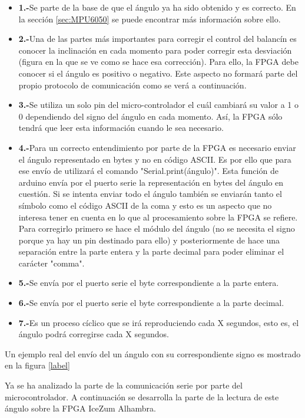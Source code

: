 \begin{itemize}
	\item \textbf{1.-}Se parte de la base de que el ángulo ya ha sido obtenido y es correcto. En la sección \ref{sec:MPU6050} se puede encontrar más información sobre ello.
	\item \textbf{2.-}Una de las partes más importantes para corregir el control del balancín es conocer la inclinación en cada momento para poder corregir esta desviación (figura en la que se ve como se hace esa corrección). Para ello, la FPGA debe conocer si el ángulo es positivo o negativo. Este aspecto no formará parte del propio protocolo de comunicación como se verá a continuación.
	\item \textbf{3.-}Se utiliza un solo pin del micro-controlador el cuál cambiará su valor a 1 o 0 dependiendo del signo del ángulo en cada momento. Así, la FPGA sólo tendrá que leer esta información cuando le sea necesario.
	\item \textbf{4.-}Para un correcto entendimiento por parte de la FPGA es necesario enviar el ángulo representado en bytes y no en código ASCII. Es por ello que para ese envío de utilizará el comando "Serial.print(ángulo)". Esta función de arduino envía por el puerto serie la representación en bytes del ángulo en cuestión.\newline
	Si se intenta enviar todo el ángulo también se enviarán tanto el símbolo como el código ASCII de la coma y esto es un aspecto que no interesa tener en cuenta en lo que al procesamiento sobre la FPGA se refiere. Para corregirlo primero se hace el módulo del ángulo (no se necesita el signo porque ya hay un pin destinado para ello) y posteriormente de hace una separación entre la parte entera y la parte decimal para poder eliminar el carácter "comma". 
	
	\item \textbf{5.-}Se envía por el puerto serie el byte correspondiente a la parte entera. 
	\item \textbf{6.-}Se envía por el puerto serie el byte correspondiente a la parte decimal. 
	\item \textbf{7.-}Es un proceso cíclico que se irá reproduciendo cada X segundos, esto es, el ángulo podrá corregirse cada X segundos. 
\end{itemize}
Un ejemplo real del envío del un ángulo con su correspondiente signo es mostrado en la figura \ref{label}

Ya se ha analizado la parte de la comunicación serie por parte del microcontrolador. A continuación se desarrolla la parte de la lectura de este ángulo sobre la FPGA IceZum Alhambra. \newline

